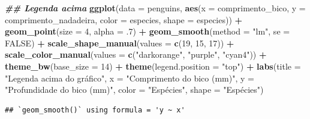 \documentclass[
]{article}
\newenvironment{Shaded}{\begin{snugshade}}{\end{snugshade}}
\newcommand{\AttributeTok}[1]{\textcolor[rgb]{0.13,0.29,0.53}{#1}}
\newcommand{\ConstantTok}[1]{\textcolor[rgb]{0.56,0.35,0.01}{#1}}
\newcommand{\DecValTok}[1]{\textcolor[rgb]{0.00,0.00,0.81}{#1}}
\newcommand{\DocumentationTok}[1]{\textcolor[rgb]{0.56,0.35,0.01}{\textbf{\textit{#1}}}}
\newcommand{\FunctionTok}[1]{\textcolor[rgb]{0.13,0.29,0.53}{\textbf{#1}}}
\newcommand{\NormalTok}[1]{#1}
\newcommand{\SpecialCharTok}[1]{\textcolor[rgb]{0.81,0.36,0.00}{\textbf{#1}}}
\newcommand{\StringTok}[1]{\textcolor[rgb]{0.31,0.60,0.02}{#1}}
\begin{document}
\begin{Shaded}
\begin{Highlighting}[]
\DocumentationTok{\#\# Legenda acima}
\FunctionTok{ggplot}\NormalTok{(}\AttributeTok{data =}\NormalTok{ penguins, }
       \FunctionTok{aes}\NormalTok{(}\AttributeTok{x =}\NormalTok{ comprimento\_bico, }\AttributeTok{y =}\NormalTok{ comprimento\_nadadeira,}
           \AttributeTok{color =}\NormalTok{ especies, }\AttributeTok{shape =}\NormalTok{ especies)) }\SpecialCharTok{+}
    \FunctionTok{geom\_point}\NormalTok{(}\AttributeTok{size =} \DecValTok{4}\NormalTok{, }\AttributeTok{alpha =}\NormalTok{ .}\DecValTok{7}\NormalTok{) }\SpecialCharTok{+}
    \FunctionTok{geom\_smooth}\NormalTok{(}\AttributeTok{method =} \StringTok{"lm"}\NormalTok{, }\AttributeTok{se =} \ConstantTok{FALSE}\NormalTok{) }\SpecialCharTok{+}
    \FunctionTok{scale\_shape\_manual}\NormalTok{(}\AttributeTok{values =} \FunctionTok{c}\NormalTok{(}\DecValTok{19}\NormalTok{, }\DecValTok{15}\NormalTok{, }\DecValTok{17}\NormalTok{)) }\SpecialCharTok{+}
    \FunctionTok{scale\_color\_manual}\NormalTok{(}\AttributeTok{values =} \FunctionTok{c}\NormalTok{(}\StringTok{"darkorange"}\NormalTok{, }\StringTok{"purple"}\NormalTok{, }\StringTok{"cyan4"}\NormalTok{)) }\SpecialCharTok{+}
    \FunctionTok{theme\_bw}\NormalTok{(}\AttributeTok{base\_size =} \DecValTok{14}\NormalTok{) }\SpecialCharTok{+}
    \FunctionTok{theme}\NormalTok{(}\AttributeTok{legend.position =} \StringTok{"top"}\NormalTok{) }\SpecialCharTok{+}
    \FunctionTok{labs}\NormalTok{(}\AttributeTok{title =} \StringTok{"Legenda acima do gráfico"}\NormalTok{, }\AttributeTok{x =} \StringTok{"Comprimento do bico (mm)"}\NormalTok{, }
         \AttributeTok{y =} \StringTok{"Profundidade do bico (mm)"}\NormalTok{, }\AttributeTok{color =} \StringTok{"Espécies"}\NormalTok{, }\AttributeTok{shape =} \StringTok{"Espécies"}\NormalTok{)}
\end{Highlighting}
\end{Shaded}

\begin{verbatim}
## `geom_smooth()` using formula = 'y ~ x'
\end{verbatim}
\end{document}
